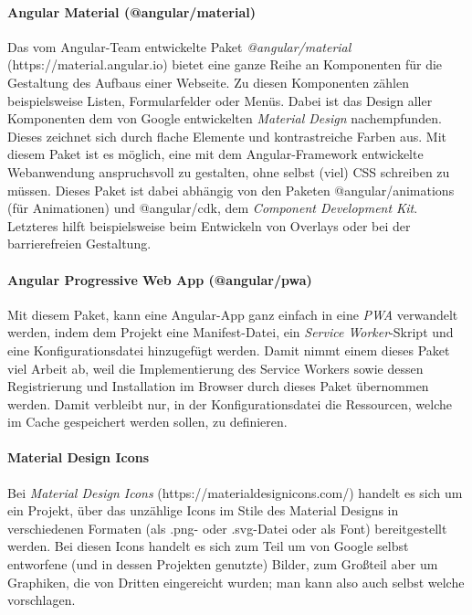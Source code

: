 \paragraph*{Angular Material (@angular/material)}
\label{sec:technologies:material}
Das vom Angular-Team entwickelte Paket \textit{@angular/material} (https://material.angular.io) bietet eine ganze Reihe an Komponenten für die Gestaltung des Aufbaus einer Webseite. Zu diesen Komponenten zählen beispielsweise Listen, Formularfelder oder Menüs. Dabei ist das Design aller Komponenten dem von Google entwickelten \textit{Material Design} nachempfunden. Dieses zeichnet sich durch flache Elemente und kontrastreiche Farben aus. Mit diesem Paket ist es möglich, eine mit dem Angular-Framework entwickelte Webanwendung anspruchsvoll zu gestalten, ohne selbst (viel) \acs{CSS} schreiben zu müssen. Dieses Paket ist dabei abhängig von den Paketen @angular/animations (für Animationen) und @angular/cdk, dem \textit{Component Development Kit}. Letzteres hilft beispielsweise beim Entwickeln von Overlays oder bei der barrierefreien Gestaltung.

\paragraph*{Angular Progressive Web App (@angular/pwa)}
\label{sec:technologies:angular/pwa}
Mit diesem Paket, kann eine Angular-App ganz einfach in eine \textit{\acl{PWA}} verwandelt werden, indem dem Projekt eine Manifest-Datei, ein \textit{Service Worker}-Skript und eine Konfigurationsdatei hinzugefügt werden. Damit nimmt einem dieses Paket viel Arbeit ab, weil die Implementierung des Service Workers sowie dessen Registrierung und Installation im Browser durch dieses Paket übernommen werden. Damit verbleibt nur, in der Konfigurationsdatei die Ressourcen, welche im Cache gespeichert werden sollen, zu definieren.

\paragraph*{Material Design Icons}
\label{sec:technologies:Mat-Icons}
Bei \textit{Material Design Icons} (https://materialdesignicons.com/) handelt es sich um ein Projekt, über das unzählige Icons im Stile des Material Designs in verschiedenen Formaten (als .png- oder .svg-Datei oder als Font) bereitgestellt werden. Bei diesen Icons handelt es sich zum Teil um von Google selbst entworfene (und in dessen Projekten genutzte) Bilder, zum Großteil aber um Graphiken, die von Dritten eingereicht wurden; man kann also auch selbst welche vorschlagen.

